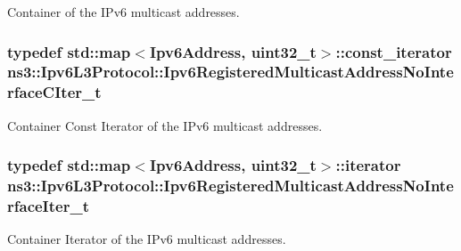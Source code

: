 Container of the I\+Pv6 multicast addresses. 

\subsubsection[{\texorpdfstring{Ipv6\+Registered\+Multicast\+Address\+No\+Interface\+C\+Iter\+\_\+t}{Ipv6RegisteredMulticastAddressNoInterfaceCIter_t}}]{\setlength{\rightskip}{0pt plus 5cm}typedef std\+::map$<${\bf Ipv6\+Address}, uint32\+\_\+t$>$\+::const\+\_\+iterator {\bf ns3\+::\+Ipv6\+L3\+Protocol\+::\+Ipv6\+Registered\+Multicast\+Address\+No\+Interface\+C\+Iter\+\_\+t}\hspace{0.3cm}{\ttfamily [private]}}\hypertarget{classns3_1_1Ipv6L3Protocol_a635e981d0b583b98e00909163710dea9}{}\label{classns3_1_1Ipv6L3Protocol_a635e981d0b583b98e00909163710dea9}


Container Const Iterator of the I\+Pv6 multicast addresses. 

\subsubsection[{\texorpdfstring{Ipv6\+Registered\+Multicast\+Address\+No\+Interface\+Iter\+\_\+t}{Ipv6RegisteredMulticastAddressNoInterfaceIter_t}}]{\setlength{\rightskip}{0pt plus 5cm}typedef std\+::map$<${\bf Ipv6\+Address}, uint32\+\_\+t$>$\+::iterator {\bf ns3\+::\+Ipv6\+L3\+Protocol\+::\+Ipv6\+Registered\+Multicast\+Address\+No\+Interface\+Iter\+\_\+t}\hspace{0.3cm}{\ttfamily [private]}}\hypertarget{classns3_1_1Ipv6L3Protocol_ae91d00bae00de8b86d6bacdf8101864b}{}\label{classns3_1_1Ipv6L3Protocol_ae91d00bae00de8b86d6bacdf8101864b}


Container Iterator of the I\+Pv6 multicast addresses. 

